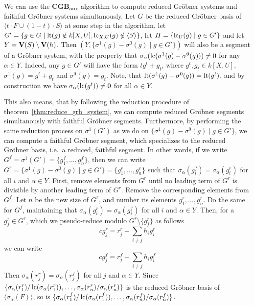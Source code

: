 \begin{remark}\label{rem:CGS_CGB_together}\upshape
  We can use the $\mathbf{CGB_{aux}}$ algorithm to compute reduced Gröbner systems and faithful Gröbner systems simultanously. Let $G$ be the reduced Gröbner basis of $\langle t \cdot F \cup (1 - t) \cdot S \rangle$ at some step in the algorithm, let $G' = \{g \in G \mid \operatorname{lt}(g) \notin k[X, U], \operatorname{lc}_{X, U}(g) \notin \langle S \rangle\}$, let $H = \{\operatorname{lc}_{U}(g) \mid g \in G'\}$ and let $Y = \operatorname{\mathbf V}(S) \setminus \operatorname{\mathbf V}(h)$. Then $(Y, \{\sigma^{1}(g) - \sigma^{0}(g) \mid g \in G'\})$ will also be a segment of a Gröbner system, with the property that $\sigma_{\alpha}(\operatorname{lc}(\sigma^{1}(g) - \sigma^{0}(g))) \neq 0$ for any $\alpha \in Y$. Indeed, any $g \in G'$ will have the form $t g^{t} + g_{t}$, where $g^{t}, g_{t} \in k[X, U]$, $\sigma^{1}(g) = g^{t} + g_{t}$ and $\sigma^{0}(g) = g_{t}$. Note, that $\operatorname{lt}(\sigma^{1}(g) - \sigma^{0}(g)) = \operatorname{lt}(g^{t})$, and by construction we have $\sigma_{\alpha}(\operatorname{lc}(g^{t})) \neq 0$ for all $\alpha \in Y$.

  This also means, that by following the reduction procedure of theorem~\ref{thm:reduce_grb_system}, we can compute reduced Gröbner segments simultanously with faithful Gröbner segments. Furthermore, by performing the same reduction process on $\sigma^{1}(G')$ as we do on $\{\sigma^{1}(g) - \sigma^{0}(g) \mid g \in G'\}$, we can compute a faithful Gröbner segment, which specializes to the reduced Gröbner basis, i.e.\ a reduced, faithful segment. In other words, if we write $G^{f} = \sigma^{1}(G') = \{g^{f}_{1}, \dots, g^{f}_{n}\}$, then we can write $G^{r} = \{\sigma^{1}(g) - \sigma^{0}(g) \mid g \in G'\} = \{g^{r}_{1}, \dots, g^{r}_{n}\}$ such that $\sigma_{\alpha}(g^{f}_{i}) = \sigma_{\alpha}(g^{r}_{i})$ for all $i$ and $\alpha \in Y$. First, remove elements from $G^{r}$ until no leading term of $G^{r}$ is divisible by another leading term of $G^{r}$. Remove the corresponding elements from $G^{f}$. Let $n$ be the new size of $G^{r}$, and number its elements $g^{r}_{1}, \dots, g^{r}_{n}$. Do the same for $G^{f}$, maintaining that $\sigma_{\alpha}(g^{r}_{i}) = \sigma_{\alpha}(g^{f}_{i})$ for all $i$ and $\alpha \in Y$. Then, for a $g^{r}_{j} \in G^{r}$, which we pseudo-reduce modulo $G^{r} \setminus \{g^{r}_{j}\}$ as follows
  \[c g^{r}_{j} = r^{r}_{j} + \sum_{i \neq j} h_{i} g^{r}_{i}\]
  we can write
  \[c g^{f}_{j} = r^{f}_{j} + \sum_{i \neq j} h_{i} g^{f}_{i}\]
  Then $\sigma_{\alpha}(r^{r}_{j}) = \sigma_{\alpha}(r^{f}_{j})$ for all $j$ and $\alpha \in Y$. Since $\{\sigma_{\alpha}(r^{r}_{1})/\operatorname{lc}(\sigma_{\alpha}(r^{r}_{1})), \dots, \sigma_{\alpha}(r^{r}_{n})/\sigma_{\alpha}(r^{r}_{n})\}$ is the reduced Gröbner basis of $\langle \sigma_{\alpha}(F) \rangle$, so is $\{\sigma_{\alpha}(r^{f}_{1})/\operatorname{lc}(\sigma_{\alpha}(r^{f}_{1})), \dots, \sigma_{\alpha}(r^{f}_{n})/\sigma_{\alpha}(r^{f}_{n})\}$.


\end{remark}

